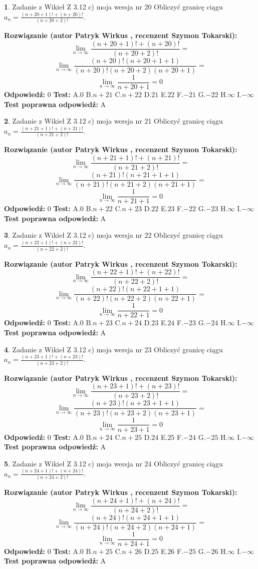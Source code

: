 \documentclass[12pt, a4paper]{article}
\theoremstyle{definition} %
\newtheorem{zad}{}
\newcommand{\zadStart}[1]{\begin{zad}#1\newline}
\newcommand{\zadStop}{\end{zad}}
\newcommand{\rozwStart}[2]{\noindent \textbf{Rozwiązanie (autor #1 , recenzent #2): }\newline}
\newcommand{\rozwStop}{\newline}
\newcommand{\odpStart}{\noindent \textbf{Odpowiedź:}\newline}
\newcommand{\odpStop}{\newline}
\newcommand{\testStart}{\noindent \textbf{Test:}\newline}
\newcommand{\testStop}{\newline}
\newcommand{\kluczStart}{\noindent \textbf{Test poprawna odpowiedź:}\newline}
\newcommand{\kluczStop}{\newline}
\begin{document}
\zadStart{Zadanie z Wikieł Z 3.12 c) moja wersja nr 20}
Obliczyć granicę ciągu $a_{n}=\frac{(n+20+1)!+(n+20)!}{(n+20+2)!}$.
\zadStop
\rozwStart{Patryk Wirkus}{Szymon Tokarski}
$$\lim\limits_{n\to\infty}\frac{(n+20+1)!+(n+20)!}{(n+20+2)!}=$$
$$\lim\limits_{n\to\infty}\frac{(n+20)!(n+20+1+1)}{(n+20)!(n+20+2)(n+20+1)}=$$
$$\lim\limits_{n\to\infty}\frac{1}{n+20+1}= 0$$
\rozwStop
\odpStart
$0$
\odpStop
\testStart
A.$0$
B.$n+21$
C.$n+22$
D.$21$
E.$22$
F.$-21$
G.$-22$
H.$\infty$
I.$-\infty$
\testStop
\kluczStart
A
\kluczStop



\zadStart{Zadanie z Wikieł Z 3.12 c) moja wersja nr 21}
Obliczyć granicę ciągu $a_{n}=\frac{(n+21+1)!+(n+21)!}{(n+21+2)!}$.
\zadStop
\rozwStart{Patryk Wirkus}{Szymon Tokarski}
$$\lim\limits_{n\to\infty}\frac{(n+21+1)!+(n+21)!}{(n+21+2)!}=$$
$$\lim\limits_{n\to\infty}\frac{(n+21)!(n+21+1+1)}{(n+21)!(n+21+2)(n+21+1)}=$$
$$\lim\limits_{n\to\infty}\frac{1}{n+21+1}= 0$$
\rozwStop
\odpStart
$0$
\odpStop
\testStart
A.$0$
B.$n+22$
C.$n+23$
D.$22$
E.$23$
F.$-22$
G.$-23$
H.$\infty$
I.$-\infty$
\testStop
\kluczStart
A
\kluczStop



\zadStart{Zadanie z Wikieł Z 3.12 c) moja wersja nr 22}
Obliczyć granicę ciągu $a_{n}=\frac{(n+22+1)!+(n+22)!}{(n+22+2)!}$.
\zadStop
\rozwStart{Patryk Wirkus}{Szymon Tokarski}
$$\lim\limits_{n\to\infty}\frac{(n+22+1)!+(n+22)!}{(n+22+2)!}=$$
$$\lim\limits_{n\to\infty}\frac{(n+22)!(n+22+1+1)}{(n+22)!(n+22+2)(n+22+1)}=$$
$$\lim\limits_{n\to\infty}\frac{1}{n+22+1}= 0$$
\rozwStop
\odpStart
$0$
\odpStop
\testStart
A.$0$
B.$n+23$
C.$n+24$
D.$23$
E.$24$
F.$-23$
G.$-24$
H.$\infty$
I.$-\infty$
\testStop
\kluczStart
A
\kluczStop



\zadStart{Zadanie z Wikieł Z 3.12 c) moja wersja nr 23}
Obliczyć granicę ciągu $a_{n}=\frac{(n+23+1)!+(n+23)!}{(n+23+2)!}$.
\zadStop
\rozwStart{Patryk Wirkus}{Szymon Tokarski}
$$\lim\limits_{n\to\infty}\frac{(n+23+1)!+(n+23)!}{(n+23+2)!}=$$
$$\lim\limits_{n\to\infty}\frac{(n+23)!(n+23+1+1)}{(n+23)!(n+23+2)(n+23+1)}=$$
$$\lim\limits_{n\to\infty}\frac{1}{n+23+1}= 0$$
\rozwStop
\odpStart
$0$
\odpStop
\testStart
A.$0$
B.$n+24$
C.$n+25$
D.$24$
E.$25$
F.$-24$
G.$-25$
H.$\infty$
I.$-\infty$
\testStop
\kluczStart
A
\kluczStop



\zadStart{Zadanie z Wikieł Z 3.12 c) moja wersja nr 24}
Obliczyć granicę ciągu $a_{n}=\frac{(n+24+1)!+(n+24)!}{(n+24+2)!}$.
\zadStop
\rozwStart{Patryk Wirkus}{Szymon Tokarski}
$$\lim\limits_{n\to\infty}\frac{(n+24+1)!+(n+24)!}{(n+24+2)!}=$$
$$\lim\limits_{n\to\infty}\frac{(n+24)!(n+24+1+1)}{(n+24)!(n+24+2)(n+24+1)}=$$
$$\lim\limits_{n\to\infty}\frac{1}{n+24+1}= 0$$
\rozwStop
\odpStart
$0$
\odpStop
\testStart
A.$0$
B.$n+25$
C.$n+26$
D.$25$
E.$26$
F.$-25$
G.$-26$
H.$\infty$
I.$-\infty$
\testStop
\kluczStart
A
\kluczStop
\end{document}
